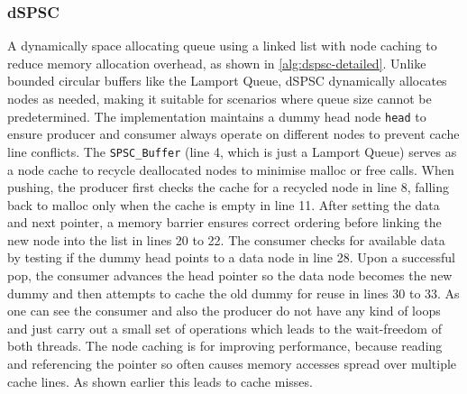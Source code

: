 \subsubsection{\acf{dSPSC}}
A dynamically space allocating queue using a linked list with node caching to reduce memory allocation overhead, as shown in \cref{alg:dspsc-detailed}. Unlike bounded circular buffers like the Lamport Queue, dSPSC dynamically allocates nodes as needed, making it suitable for scenarios where queue size cannot be predetermined. The implementation maintains a dummy head node \texttt{head} to ensure producer and consumer always operate on different nodes to prevent cache line conflicts. The \texttt{SPSC\_Buffer} (line 4, which is just a Lamport Queue) serves as a node cache to recycle deallocated nodes to minimise malloc or free calls. When pushing, the producer first checks the cache for a recycled node in line 8, falling back to malloc only when the cache is empty in line 11. After setting the data and next pointer, a memory barrier ensures correct ordering before linking the new node into the list in lines 20 to 22. The consumer checks for available data by testing if the dummy head points to a data node in line 28. Upon a successful pop, the consumer advances the head pointer so the data node becomes the new dummy and then attempts to cache the old dummy for reuse in lines 30 to 33. As one can see the consumer and also the producer do not have any kind of loops and just carry out a small set of operations which leads to the wait-freedom of both threads. The node caching is for improving performance, because reading and referencing the pointer so often causes memory accesses spread over multiple cache lines. As shown earlier this leads to cache misses. \cite{torquati2010singleproducersingleconsumerqueuessharedcache}

